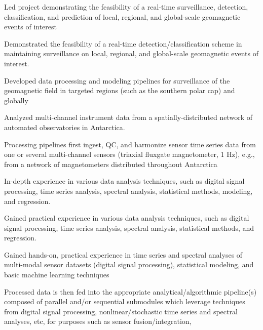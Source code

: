   \item Led project demonstrating the feasibility of a real-time
    surveillance, detection, classification, and prediction of 
    local, regional, and global-scale geomagnetic events of interest
  \item Demonstrated the feasibility of a real-time
    detection/classification scheme in maintaining surveillance on
    local, regional, and global-scale geomagnetic events of interest.
  \item Developed data processing and modeling pipelines for
    surveillance of the geomagnetic field in targeted regions (such as
    the southern polar cap) and globally
  \item
    Analyzed multi-channel instrument data from a spatially-distributed
    network of automated observatories in Antarctica.
  \item Processing pipelines first ingest, QC, and harmonize sensor time series data
    from one or several multi-channel sensors (triaxial fluxgate 
    magnetometer, 1 Hz), e.g., from a network of magnetometers 
    distributed throughout Antarctica
  \item In-depth experience in various data analysis techniques,
    such as digital signal processing, time series analysis, spectral analysis,
    statistical methods, modeling, and regression.
  \item Gained practical experience in various data analysis techniques,
    such as digital signal processing, time series analysis, spectral analysis,
    statistical methods, and regression.
  \item Gained hands-on, practical experience in time series and spectral 
    analyses of multi-modal sensor datasets (digital signal processing),
    statistical modeling, and basic machine learning techniques 
  \item Processed data is then fed into the appropriate
    analytical/algorithmic pipeline(s) composed of parallel and/or 
    sequential submodules which leverage techniques from digital
    signal processing, nonlinear/stochastic time series and spectral
    analyses, etc, for purposes such as sensor fusion/integration, 
